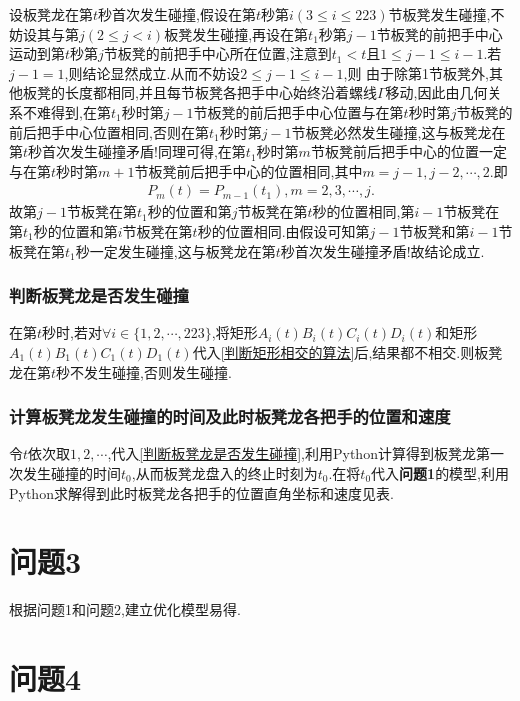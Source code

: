 \documentclass[lang=cn,newtx,10pt,scheme=chinese]{../Template/elegantbook}
\begin{document}
设板凳龙在第$t$秒首次发生碰撞,假设在第$t$秒第$i(3\leq i\leq 223)$节板凳发生碰撞,不妨设其与第$j(2\leq j<i)$板凳发生碰撞,再设在第$t_1$秒第$j-1$节板凳的前把手中心运动到第$t$秒第$j$节板凳的前把手中心所在位置,注意到$t_1<t$且$1\leq j-1\leq i-1$.若$j-1=1$,则结论显然成立.从而不妨设$2\leq j-1\leq i-1$,则
由于除第1节板凳外,其他板凳的长度都相同,并且每节板凳各把手中心始终沿着螺线$\varGamma$移动,因此由几何关系不难得到,在第$t_1$秒时第$j-1$节板凳的前后把手中心位置与在第$t$秒时第$j$节板凳的前后把手中心位置相同,否则在第$t_1$秒时第$j-1$节板凳必然发生碰撞,这与板凳龙在第$t$秒首次发生碰撞矛盾!同理可得,在第$t_1$秒时第$m$节板凳前后把手中心的位置一定与在第$t$秒时第$m+1$节板凳前后把手中心的位置相同,其中$m=j-1,j-2,\cdots,2$.即
\begin{align}
P_m\left( t \right) =P_{m-1}\left( t_1 \right) ,m=2,3,\cdots ,j.
\end{align}
故第$j-1$节板凳在第$t_1$秒的位置和第$j$节板凳在第$t$秒的位置相同,第$i-1$节板凳在第$t_1$秒的位置和第$i$节板凳在第$t$秒的位置相同.由假设可知第$j-1$节板凳和第$i-1$节板凳在第$t_1$秒一定发生碰撞,这与板凳龙在第$t$秒首次发生碰撞矛盾!故结论成立.


\subsection{判断板凳龙是否发生碰撞}\label{判断板凳龙是否发生碰撞}

在第$t$秒时,若对$\forall i\in\{1,2,\cdots,223\}$,将矩形$A_i(t)B_i(t)C_i(t)D_i(t)$和矩形$A_1(t)B_1(t)C_1(t)D_1(t)$代入\eqref{判断矩形相交的算法}后,结果都不相交.则板凳龙在第$t$秒不发生碰撞,否则发生碰撞.

\subsection{计算板凳龙发生碰撞的时间及此时板凳龙各把手的位置和速度}

令$t$依次取$1,2,\cdots$,代入\eqref{判断板凳龙是否发生碰撞},利用Python计算得到板凳龙第一次发生碰撞的时间$t_0$,从而板凳龙盘入的终止时刻为$t_0$.在将$t_0$代入\textbf{问题1}的模型,利用Python求解得到此时板凳龙各把手的位置直角坐标和速度见表.



\chapter{问题3}

根据问题1和问题2,建立优化模型易得.

\chapter{问题4}
\end{document}
